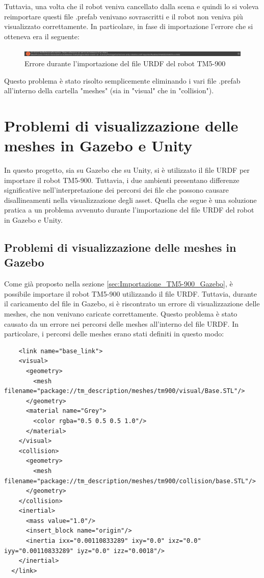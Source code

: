 \documentclass[11pt]{report}
\begin{document}
Tuttavia, una volta che il robot veniva cancellato dalla scena e quindi lo si voleva reimportare questi file .prefab venivano sovrascritti e il robot non veniva più visualizzato correttamente. In particolare, in fase di importazione l'errore che si otteneva era il seguente:

\begin{figure} [H]
    \centering
    \includegraphics[width=1\textwidth]{images/errore_prefab.PNG}
    \caption{Errore durante l'importazione del file URDF del robot TM5-900}
    \label{fig:errore_prefab}
\end{figure}

Questo problema è stato risolto semplicemente eliminando i vari file .prefab all'interno della cartella "meshes" (sia in "visual" che in "collision").


\section{Problemi di visualizzazione delle meshes in Gazebo e Unity}
\label{sec:visualizzazione_meshes}
In questo progetto, sia su Gazebo che su Unity, si è utilizzato il file URDF per importare il robot TM5-900. Tuttavia, i due ambienti presentano differenze significative nell’interpretazione dei percorsi dei file che possono causare disallineamenti nella visualizzazione degli asset.
Quella che segue è una soluzione pratica a un problema avvenuto durante l'importazione del file URDF del robot in Gazebo e Unity.

\subsection{Problemi di visualizzazione delle meshes in Gazebo}
\label{sec:Problemi_visualizzazione_Gazebo}
Come già proposto nella sezione \ref{sec:Importazione_TM5-900_Gazebo}, è possibile importare il robot TM5-900 utilizzando il file URDF. Tuttavia, durante il caricamento del file in Gazebo, si è riscontrato un errore di visualizzazione delle meshes, che non venivano caricate correttamente. Questo problema è stato causato da un errore nei percorsi delle meshes all'interno del file URDF. In particolare, i percorsi delle meshes erano stati definiti in questo modo:

\begin{verbatim}
    <link name="base_link">
    <visual>
      <geometry>
        <mesh filename="package://tm_description/meshes/tm900/visual/Base.STL"/>
      </geometry>
      <material name="Grey">
        <color rgba="0.5 0.5 0.5 1.0"/>
      </material>
    </visual>
    <collision>
      <geometry>
        <mesh filename="package://tm_description/meshes/tm900/collision/base.STL"/>
      </geometry>
    </collision>
    <inertial>
      <mass value="1.0"/>
      <insert_block name="origin"/>
      <inertia ixx="0.00110833289" ixy="0.0" ixz="0.0" iyy="0.00110833289" iyz="0.0" izz="0.0018"/>
    </inertial>
  </link>
\end{verbatim}
\end{document}
